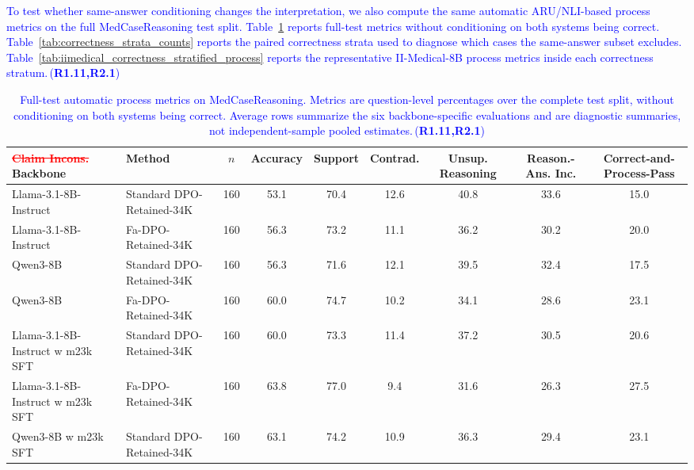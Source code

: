 \documentclass[a4paper,fleqn,doubleblind]{cas-sc}
\DeclareRobustCommand{\deleted}[1]{\textcolor{red}{\sout{#1}}}
\DeclareRobustCommand{\added}[1]{\textcolor{blue}{#1}}
\DeclareRobustCommand{\revtag}[1]{\textcolor{blue}{\scriptsize\,(\textbf{#1})}}
\begin{document}
\added{To test whether same-answer conditioning changes the interpretation, we also compute the same automatic ARU/NLI-based process metrics on the full MedCaseReasoning test split. Table~\ref{tab:full_set_process_metrics} reports full-test metrics without conditioning on both systems being correct. Table~\ref{tab:correctness_strata_counts} reports the paired correctness strata used to diagnose which cases the same-answer subset excludes. Table~\ref{tab:iimedical_correctness_stratified_process} reports the representative II-Medical-8B process metrics inside each correctness stratum.}\revtag{R1.11,R2.1}

\begin{table}[htbp]
    \centering
    \scriptsize
    \setlength{\tabcolsep}{3pt}
    \caption{\added{Full-test automatic process metrics on MedCaseReasoning. Metrics are question-level percentages over the complete test split, without conditioning on both systems being correct. Average rows summarize the six backbone-specific evaluations and are diagnostic summaries, not independent-sample pooled estimates.}\revtag{R1.11,R2.1}}
    \label{tab:full_set_process_metrics}
    \begin{adjustbox}{max width=\textwidth}
    \begingroup\color{blue}
    \begin{tabular}{llccccccc}
        \toprule
\deleted{Claim Incons.}
        \textbf{Backbone} & \textbf{Method} & \textbf{$n$} & \textbf{Accuracy} & \textbf{Support} & \textbf{Contrad.} & \textbf{Unsup. Reasoning} & \textbf{Reason.-Ans. Inc.} & \textbf{Correct-and-Process-Pass} \\
        \midrule
        Llama-3.1-8B-Instruct & Standard DPO-Retained-34K & 160 & 53.1 & 70.4 & 12.6 & 40.8 & 33.6 & 15.0 \\
        Llama-3.1-8B-Instruct & Fa-DPO-Retained-34K & 160 & 56.3 & 73.2 & 11.1 & 36.2 & 30.2 & 20.0 \\
        Qwen3-8B & Standard DPO-Retained-34K & 160 & 56.3 & 71.6 & 12.1 & 39.5 & 32.4 & 17.5 \\
        Qwen3-8B & Fa-DPO-Retained-34K & 160 & 60.0 & 74.7 & 10.2 & 34.1 & 28.6 & 23.1 \\
        Llama-3.1-8B-Instruct w m23k SFT & Standard DPO-Retained-34K & 160 & 60.0 & 73.3 & 11.4 & 37.2 & 30.5 & 20.6 \\
        Llama-3.1-8B-Instruct w m23k SFT & Fa-DPO-Retained-34K & 160 & 63.8 & 77.0 & 9.4 & 31.6 & 26.3 & 27.5 \\
        Qwen3-8B w m23k SFT & Standard DPO-Retained-34K & 160 & 63.1 & 74.2 & 10.9 & 36.3 & 29.4 & 23.1 \\

\end{tabular}
\end{adjustbox}
\end{table}
\end{document}
